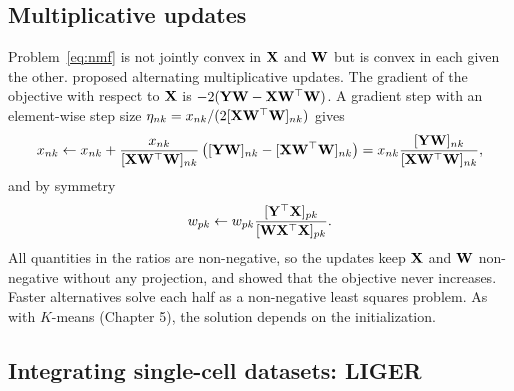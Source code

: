 \subsection{Multiplicative updates}

Problem~\eqref{eq:nmf} is not jointly convex in $\mathbf{X}$ and $\mathbf{W}$ but is convex in each given the other. \citet{lee2001} proposed alternating multiplicative updates. The gradient of the objective with respect to $\mathbf{X}$ is $-2(\mathbf{Y}\mathbf{W}-\mathbf{X}\mathbf{W}^\top\mathbf{W})$. A gradient step with an element-wise step size $\eta_{nk}=x_{nk}/(2[\mathbf{X}\mathbf{W}^\top\mathbf{W}]_{nk})$ gives
\begin{equation}
  x_{nk}\leftarrow x_{nk}+\frac{x_{nk}}{[\mathbf{X}\mathbf{W}^\top\mathbf{W}]_{nk}}\left([\mathbf{Y}\mathbf{W}]_{nk}-[\mathbf{X}\mathbf{W}^\top\mathbf{W}]_{nk}\right)
  = x_{nk}\frac{[\mathbf{Y}\mathbf{W}]_{nk}}{[\mathbf{X}\mathbf{W}^\top\mathbf{W}]_{nk}},
\end{equation}
and by symmetry
\begin{equation}
  w_{pk}\leftarrow w_{pk}\frac{[\mathbf{Y}^\top\mathbf{X}]_{pk}}{[\mathbf{W}\mathbf{X}^\top\mathbf{X}]_{pk}}.
\end{equation}
All quantities in the ratios are non-negative, so the updates keep $\mathbf{X}$ and $\mathbf{W}$ non-negative without any projection, and \citet{lee2001} showed that the objective never increases. Faster alternatives solve each half as a non-negative least squares problem. As with $K$-means (Chapter 5), the solution depends on the initialization.

\subsection{Integrating single-cell datasets: LIGER}


